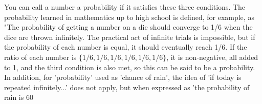 \documentclass{ltjbook}
\begin{document}
You can call a number a probability if it satisfies these three conditions.
The probability learned in mathematics up to high school is defined, for example, as "The probability of getting a number on a die should converge to 1/6 when the dice are thrown infinitely. The practical act of infinite trials is impossible, but if the probability of each number is equal, it should eventually reach 1/6. If the ratio of each number is $\{ 1/6,1/6,1/6,1/6,1/6,1/6 \}$, it is non-negative, all added to 1, and the third condition is also met, so this can be said to be a probability. In addition, for 'probability' used as 'chance of rain', the idea of 'if today is repeated infinitely...' does not apply, but when expressed as 'the probability of rain is 60%
\end{document}
